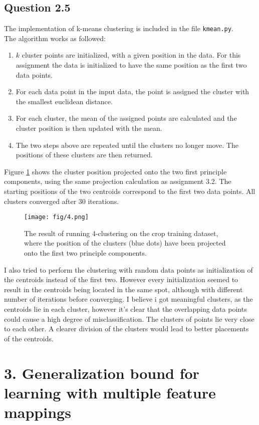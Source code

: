 \documentclass{article}
\begin{document}
\subsection{Question 2.5}
The implementation of k-means clustering is included in the file \texttt{kmean.py}. \\ The algorithm works as followed:
\begin{enumerate}
\item{$k$ cluster points are initialized, with a given position in the data. For this assignment the data is initialized to have the same position as the first two data points.}
\item{For each data point in the input data, the point is assigned the cluster with the smallest euclidean distance.}
\item{For each cluster, the mean of the assigned points are calculated
and the cluster position is then updated with the mean.
}
\item{The two steps above are repeated until the clusters no longer move. The positions of these clusters are then returned.}
\end{enumerate}
Figure \ref{fig:clust1} shows the cluster position projected onto the two first principle components, using the same projection calculation as assignment 3.2. The starting positions of the two centroids correspond to the first two data points. All clusters converged after 30 iterations.
\begin{figure}[H]
  \centering
  \texttt{[image: fig/4.png]}
  \caption{The result of running 4-clustering on the crop training dataset, where the position of the clusters (blue dots) have been projected onto the first two principle components.
  }
  \label{fig:clust1}
\end{figure}
I also tried to perform the clustering with random data points as initialization of the centroids instead of the first two. However every initialization seemed to result in the centroids being located in the same spot, although with different number of iterations before converging. I believe i got meaningful clusters, as the centroids lie in each cluster, however it's clear that the overlapping data points could cause a high degree of misclassification. The clusters of points lie very close to each other. A clearer division of the clusters would lead to better placements of the centroids.
\section{3. Generalization bound for learning with multiple feature mappings}
\end{document}
